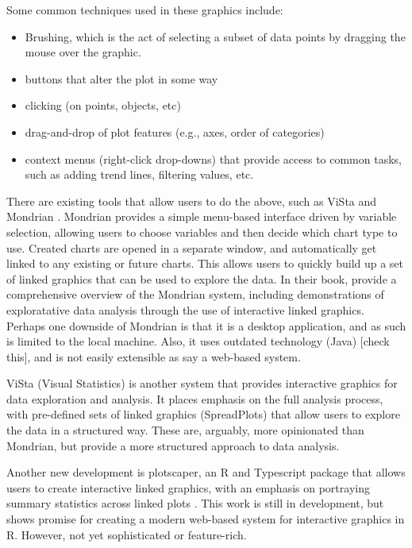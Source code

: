 \documentclass{article}
\newcommand{\prog}[1]{{\sf #1}}
\newcommand{\proglang}[1]{\prog{#1}}
\newcommand{\R}{\prog{R}}
\begin{document}
Some common techniques used in these graphics include:
\begin{itemize}
\item Brushing, which is the act of selecting a subset of data points by dragging the mouse over the graphic.
\item buttons that alter the plot in some way
\item clicking (on points, objects, etc)
\item drag-and-drop of plot features (e.g., axes, order of categories)
\item context menus (right-click drop-downs) that provide access to common tasks, such as adding trend lines, filtering values, etc.
\end{itemize}

There are existing tools that allow users to do the above, such as \proglang{ViSta} \parencite{Young1996,Young2011} and \proglang{Mondrian} \parencite{Theus2014}.
\proglang{Mondrian} provides a simple menu-based interface driven by variable selection, allowing users to choose variables and then decide which chart type to use.
Created charts are opened in a separate window, and automatically get linked to any existing or future charts.
This allows users to quickly build up a set of linked graphics that can be used to explore the data.
In their book, \cite{Theus2014} provide a comprehensive overview of the \proglang{Mondrian} system, including demonstrations of exploratative data analysis through the use of interactive linked graphics.
Perhaps one downside of \proglang{Mondrian} is that it is a desktop application, and as such is limited to the local machine.
Also, it uses outdated technology (Java) [check this], and is not easily extensible as say a web-based system.

\proglang{ViSta} (Visual Statistics) is another system that provides interactive graphics for data exploration and analysis.
It places emphasis on the full analysis process, with pre-defined sets of linked graphics (SpreadPlots) that allow users to explore the data in a structured way.
These are, arguably, more opinionated than \proglang{Mondrian}, but provide a more structured approach to data analysis.

Another new development is \proglang{plotscaper}, an \R{} and \proglang{Typescript} package that allows users to create interactive linked graphics, with an emphasis on portraying summary statistics across linked plots \cite{Bartonicek2024}.
This work is still in development, but shows promise for creating a modern web-based system for interactive graphics in \R{}.
However, not yet sophisticated or feature-rich.
\end{document}
